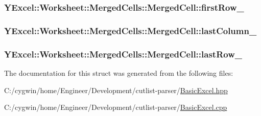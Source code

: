 \subsubsection[{first\+Row\+\_\+}]{ Y\+Excel\+::\+Worksheet\+::\+Merged\+Cells\+::\+Merged\+Cell\+::first\+Row\+\_\+}\label{struct_y_excel_1_1_worksheet_1_1_merged_cells_1_1_merged_cell_a233f5e6e275fe6687da1f7980d9d1db0}
\hypertarget{struct_y_excel_1_1_worksheet_1_1_merged_cells_1_1_merged_cell_a2b7f245bfd675ea300b3b6578795e28e}{}
\subsubsection[{last\+Column\+\_\+}]{ Y\+Excel\+::\+Worksheet\+::\+Merged\+Cells\+::\+Merged\+Cell\+::last\+Column\+\_\+}\label{struct_y_excel_1_1_worksheet_1_1_merged_cells_1_1_merged_cell_a2b7f245bfd675ea300b3b6578795e28e}
\hypertarget{struct_y_excel_1_1_worksheet_1_1_merged_cells_1_1_merged_cell_a828a60d8789a08d75ee550b882f3df52}{}
\subsubsection[{last\+Row\+\_\+}]{ Y\+Excel\+::\+Worksheet\+::\+Merged\+Cells\+::\+Merged\+Cell\+::last\+Row\+\_\+}\label{struct_y_excel_1_1_worksheet_1_1_merged_cells_1_1_merged_cell_a828a60d8789a08d75ee550b882f3df52}


The documentation for this struct was generated from the following files\+:\begin{DoxyCompactItemize}
\item 
C\+:/cygwin/home/\+Engineer/\+Development/cutlist-\/parser/\hyperlink{_basic_excel_8hpp}{Basic\+Excel.\+hpp}\item 
C\+:/cygwin/home/\+Engineer/\+Development/cutlist-\/parser/\hyperlink{_basic_excel_8cpp}{Basic\+Excel.\+cpp}\end{DoxyCompactItemize}
